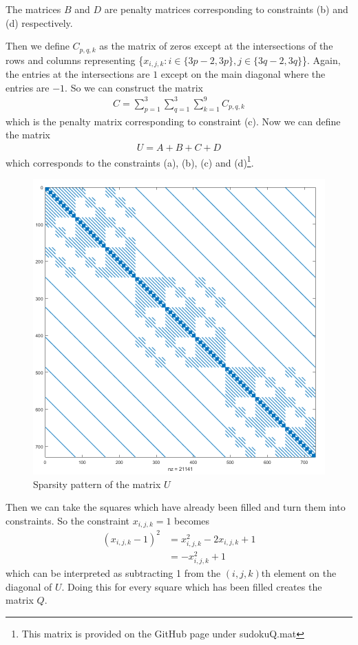 \documentclass{article}
\begin{document}
\noindent The matrices \(B\) and \(D\) are penalty matrices corresponding to constraints (b) and (d) respectively.

\noindent Then we define \(C_{p,q,k}\) as the matrix of zeros except at the intersections of the rows and columns representing \{\(x_{i,j,k}  :  i \in \{3p-2, 3p\}, j \in \{3q-2, 3q\}\)\}. Again, the entries at the intersections are \(1\) except on the main diagonal where the entries are \(-1\). So we can construct the matrix
\begin{align*}
    C = \sum_{p=1}^3\sum_{q=1}^3\sum_{k=1}^9 C_{p,q,k}
\end{align*}
which is the penalty matrix corresponding to constraint (c). Now we can define the matrix
\begin{align*}
    U = A + B + C + D
\end{align*}
which corresponds to the constraints (a), (b), (c) and (d)\footnote{This matrix is provided on the GitHub page under sudokuQ.mat }.\\

\begin{figure}[H]
    \centering
    \includegraphics[width=0.5\linewidth]{spyQ.png}
    \caption{Sparsity pattern of the matrix \(U\)}
    \label{fig:Usparse}
\end{figure}

\noindent Then we can take the squares which have already been filled and turn them into constraints. So the constraint \(x_{i,j,k} = 1\) becomes 
\begin{align*}
    (x_{i,j,k} - 1)^2 &= x_{i,j,k}^2 - 2x_{i,j,k} + 1 \\
    &= -x_{i,j,k}^2 + 1
\end{align*}
which can be interpreted as subtracting 1 from the \((i,j,k)\)th element on the diagonal of \(U\). Doing this for every square which has been filled creates the matrix \(Q\).\\
\end{document}
